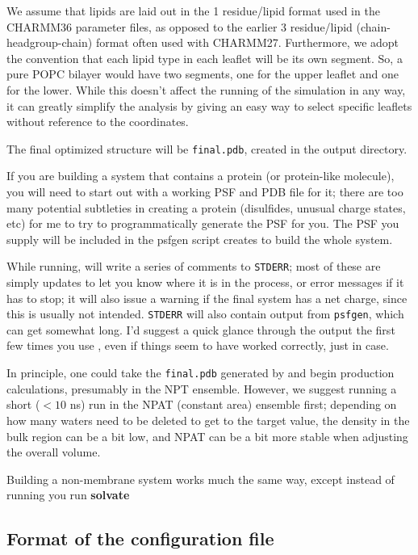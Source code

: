 \documentclass[12pt]{article}
\begin{document}
We assume that lipids are laid out in the 1 residue/lipid format
used in the CHARMM36 parameter files, as opposed to the earlier 3
residue/lipid (chain-headgroup-chain) format often used with CHARMM27.
Furthermore, we adopt the convention that each lipid type in each leaflet
will be its own segment.  So, a pure POPC bilayer would have two segments,
one for the upper leaflet and one for the lower.  While this doesn't affect
the running of the simulation in any way, it can greatly simplify the
analysis by giving an easy way to select specific leaflets without reference
to the coordinates.

The final optimized structure will be {\tt final.pdb}, created in the output
directory.

If you are building a system that contains a protein (or protein-like
molecule), you will need to start out with a working PSF and PDB file for
it; there are too many potential subtleties in creating a protein
(disulfides, unusual charge states, etc) for me to try to programmatically
generate the PSF for you.  The PSF you supply will be included in the
psfgen script {\omgwtf} creates to build the whole system.

While running, {\omgwtf} will write a series of comments to {\tt STDERR};
most of these are simply updates to let you know where it is in the
process, or error messages if it has to stop; it will also issue a warning
if the final system has a net charge, since this is usually not intended.
{\tt STDERR} will also contain output from {\tt psfgen}, which can get
somewhat long.  I'd suggest a quick glance through the output the first few
times you use {\omgwtf}, even if things seem to have worked correctly, just
in case.

In principle, one could take the {\tt final.pdb} generated by {\omgwtf} and
begin production calculations, presumably in the NPT ensemble.  However, we
suggest running a short ($<10$ ns) run in the NPAT (constant area) ensemble
first; depending on how many waters need to be deleted to get to the target
value, the density in the bulk region can be a bit low, and NPAT can be a
bit more stable when adjusting the overall volume.

Building a non-membrane system works much the same way, except instead of
running {\omgwtf} you run {\bf solvate}

\subsection{Format of the configuration file}
\label{ss:config}
\end{document}
